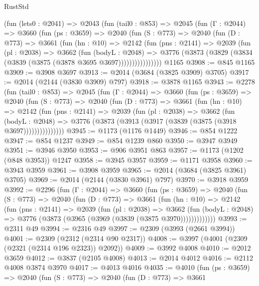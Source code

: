 \begin{lexlean}{RustStd}
\begin{coremodule}
    (fun (lets0 : @2041) =>
    @2043
      (fun (tail0 : @853) =>
      @2045
        (fun (Γ : @2044) =>
        @3660
          (fun (ps : @3659) =>
          @2040
            (fun (S : @773) =>
            @2040
              (fun (D : @773) =>
              @3661
                (fun (hn : @10) =>
                @2142
                  (fun (pns : @2141) =>
                  @2039
                    (fun (pl : @2038) =>
                    @3662
                      (fun (bodyL : @2048) =>
                      @3776 (@3873 (@3829 (@3834 (@3839 (@3875 (@3878 @3695 @3697))))))))))))))))
    @1165
@3908 := @845 @1165
@3909 := @3908 @3697
@3913 := @2014 (@3684 (@3825 @3909) @3705)
@3917 := @2014 (@2144 (@3830 @3909) @797)
@3918 := @3878 @1165
@3943 := @2278
    (fun (tail0 : @853) =>
    @2045
      (fun (Γ : @2044) =>
      @3660
        (fun (ps : @3659) =>
        @2040
          (fun (S : @773) =>
          @2040
            (fun (D : @773) =>
            @3661
              (fun (hn : @10) =>
              @2142
                (fun (pns : @2141) =>
                @2039
                  (fun (pl : @2038) =>
                  @3662
                    (fun (bodyL : @2048) =>
                    @3776 (@3873 (@3913 (@3917 (@3839 (@3875 (@3918 @3697)))))))))))))))
@3945 := @1173 (@1176 @1449)
@3946 := @854 @1222
@3947 := @854 @1237
@3949 := @854 @1239 @860
@3950 := @3947 @3949
@3951 := @3946 @3950
@3953 := @906 @3951 @863
@3957 := @1173 (@1202 (@848 @3953)) @1247
@3958 := @3945 @3957
@3959 := @1171 @3958
@3960 := @3943 @3959
@3961 := @3908 @3959
@3965 := @2014 (@3684 (@3825 @3961) @3705)
@3969 := @2014 (@2144 (@3830 @3961) @797)
@3970 := @3918 @3959
@3992 := @2296
    (fun (Γ : @2044) =>
    @3660
      (fun (ps : @3659) =>
      @2040
        (fun (S : @773) =>
        @2040
          (fun (D : @773) =>
          @3661
            (fun (hn : @10) =>
            @2142
              (fun (pns : @2141) =>
              @2039
                (fun (pl : @2038) =>
                @3662
                  (fun (bodyL : @2048) =>
                  @3776 (@3873 (@3965 (@3969 (@3839 (@3875 @3970)))))))))))))
@3993 := @2311 @49
@3994 := @2316 @49
@3997 := @2309 (@3993 (@2661 @3994))
@4001 := @2309 (@2312 (@2314 @90 @2317))
@4008 := @3997 (@4001 (@2309 (@2321 (@2314 @196 @2323)) @2092))
@4009 := @3992 @4008
@4010 := @2012 @3659
@4012 := @3837 (@2105 @4008)
@4013 := @2014 @4012
@4016 := @2112 @4008 @3874 @3970
@4017 := @4013 @4016
@4035 := @4010
    (fun (ps : @3659) =>
    @2040
      (fun (S : @773) =>
      @2040
        (fun (D : @773) =>
        @3661

\end{coremodule}
\end{lexlean}
